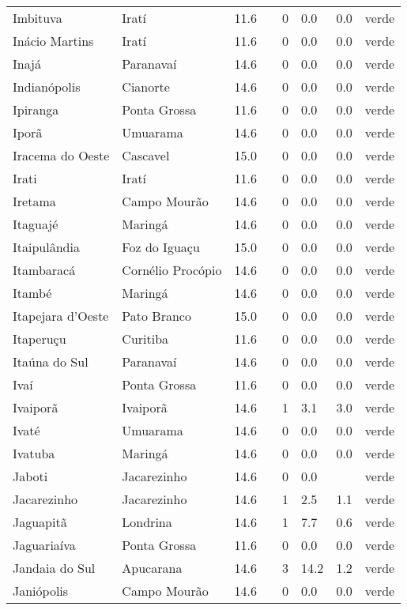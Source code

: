 \begin{longtable}{l|lllllll}
  Imbituva & Iratí & 11.6 &  & 0 & 0.0 & 0.0 & verde \\ 
  Inácio Martins & Iratí & 11.6 &  & 0 & 0.0 & 0.0 & verde \\ 
  Inajá & Paranavaí & 14.6 &  & 0 & 0.0 & 0.0 & verde \\ 
  Indianópolis & Cianorte & 14.6 &  & 0 & 0.0 & 0.0 & verde \\ 
  Ipiranga & Ponta Grossa & 11.6 &  & 0 & 0.0 & 0.0 & verde \\ 
  Iporã & Umuarama & 14.6 &  & 0 & 0.0 & 0.0 & verde \\ 
  Iracema do Oeste & Cascavel & 15.0 &  & 0 & 0.0 & 0.0 & verde \\ 
  Irati & Iratí & 11.6 &  & 0 & 0.0 & 0.0 & verde \\ 
  Iretama & Campo Mourão & 14.6 &  & 0 & 0.0 & 0.0 & verde \\ 
  Itaguajé & Maringá & 14.6 &  & 0 & 0.0 & 0.0 & verde \\ 
  Itaipulândia & Foz do Iguaçu & 15.0 &  & 0 & 0.0 & 0.0 & verde \\ 
  Itambaracá & Cornélio Procópio & 14.6 &  & 0 & 0.0 & 0.0 & verde \\ 
  Itambé & Maringá & 14.6 &  & 0 & 0.0 & 0.0 & verde \\ 
  Itapejara d'Oeste & Pato Branco & 15.0 &  & 0 & 0.0 & 0.0 & verde \\ 
  Itaperuçu & Curitiba & 11.6 &  & 0 & 0.0 & 0.0 & verde \\ 
  Itaúna do Sul & Paranavaí & 14.6 &  & 0 & 0.0 & 0.0 & verde \\ 
  Ivaí & Ponta Grossa & 11.6 &  & 0 & 0.0 & 0.0 & verde \\ 
  Ivaiporã & Ivaiporã & 14.6 &  & 1 & 3.1 & 3.0 & verde \\ 
  Ivaté & Umuarama & 14.6 &  & 0 & 0.0 & 0.0 & verde \\ 
  Ivatuba & Maringá & 14.6 &  & 0 & 0.0 & 0.0 & verde \\ 
  Jaboti & Jacarezinho & 14.6 &  & 0 & 0.0 &  & verde \\ 
  Jacarezinho & Jacarezinho & 14.6 &  & 1 & 2.5 & 1.1 & verde \\ 
  Jaguapitã & Londrina & 14.6 &  & 1 & 7.7 & 0.6 & verde \\ 
  Jaguariaíva & Ponta Grossa & 11.6 &  & 0 & 0.0 & 0.0 & verde \\ 
  Jandaia do Sul & Apucarana & 14.6 &  & 3 & 14.2 & 1.2 & verde \\ 
  Janiópolis & Campo Mourão & 14.6 &  & 0 & 0.0 & 0.0 & verde \\ 

\end{longtable}
